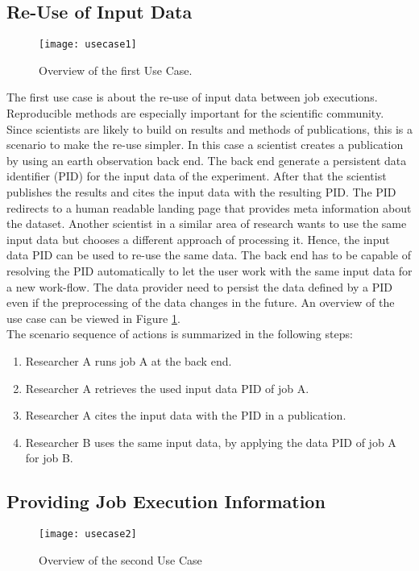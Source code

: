 \documentclass[draft,final]{vutinfth} %
\begin{document}
\subsection{Re-Use of Input Data}\label{UseCase1}
\begin{figure}[h]
	\centering
	\texttt{[image: usecase1]}
	\caption{Overview of the first Use Case.}
	\label{fig:usecase1} %
\end{figure}
The first use case is about the re-use of input data between job executions. Reproducible methods are especially important for the scientific community. Since scientists are likely to build on results and methods of publications, this is a scenario to make the re-use simpler. In this case a scientist creates a publication by using an earth observation back end. The back end generate a persistent data identifier (PID) for the input data of the experiment. After that the scientist publishes the results and cites the input data with the resulting PID. The PID redirects to a human readable landing page that provides meta information about the dataset. Another scientist in a similar area of research wants to use the same input data but chooses a different approach of processing it. Hence, the input data PID can be used to re-use the same data. The back end has to be capable of resolving the PID automatically to let the user work with the same input data for a new work-flow. The data provider need to persist the data defined by a PID even if the preprocessing of the data changes in the future.    
An overview of the use case can be viewed in Figure \ref{fig:usecase1}. \\
The scenario sequence of actions is summarized in the following steps: \\
\begin{enumerate}
	\item Researcher A runs job A at the back end.
	\item Researcher A retrieves the used input data PID of job A.
	\item Researcher A cites the input data with the PID in a publication.
	\item Researcher B uses the same input data, by applying the data PID of job A for job B.  
\end{enumerate}

\subsection{Providing Job Execution Information}\label{UseCase2}
\begin{figure}[h]
	\centering
	\texttt{[image: usecase2]}
	\caption{Overview of the second Use Case}
	\label{fig:usecase2} %
\end{figure}
\end{document}
